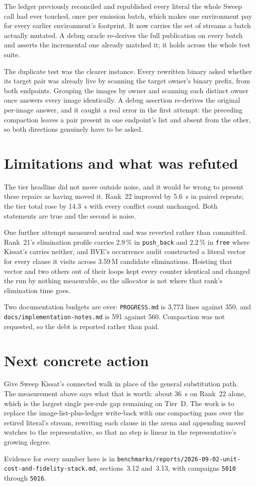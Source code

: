 \documentclass[11pt]{article}
\newcommand{\code}[1]{\texttt{#1}}
\begin{document}
The ledger previously reconciled and republished every literal the whole Sweep
call had ever touched, once per emission batch, which makes one environment pay
for every earlier environment's footprint. It now carries the set of streams a
batch actually mutated. A debug oracle re-derives the full publication on every
batch and asserts the incremental one already matched it; it holds across the
whole test suite.

The duplicate test was the clearer instance. Every rewritten binary asked
whether its target pair was already live by scanning the target owner's binary
prefix, from both endpoints. Grouping the images by owner and scanning each
distinct owner once answers every image identically. A debug assertion
re-derives the original per-image answer, and it caught a real error in the
first attempt: the preceding compaction leaves a pair present in one endpoint's
list and absent from the other, so both directions genuinely have to be asked.

\section{Limitations and what was refuted}

The tier headline did not move outside noise, and it would be wrong to present
these repairs as having moved it. Rank~22 improved by 5.6~s in paired repeats;
the tier total rose by 14.3~s with every conflict count unchanged. Both
statements are true and the second is noise.

One further attempt measured neutral and was reverted rather than committed.
Rank~21's elimination profile carries 2.9\,\% in \code{push\_back} and 2.2\,\%
in \code{free} where Kissat's carries neither, and BVE's occurrence audit
constructed a literal vector for every clause it visits across 3.59\,M
candidate eliminations. Hoisting that vector and two others out of their loops
kept every counter identical and changed the run by nothing measurable, so the
allocator is not where that rank's elimination time goes.

Two documentation budgets are over: \code{PROGRESS.md} is 3{,}773 lines against
350, and \code{docs/implementation-notes.md} is 591 against 560. Compaction was
not requested, so the debt is reported rather than paid.

\section{Next concrete action}

Give Sweep Kissat's connected walk in place of the general substitution path.
The measurement above says what that is worth: about 36~s on Rank~22 alone,
which is the largest single per-rule gap remaining on Tier~D. The work is to
replace the image-list-plus-ledger write-back with one compacting pass over the
retired literal's stream, rewriting each clause in the arena and appending
moved watches to the representative, so that no step is linear in the
representative's growing degree.

Evidence for every number here is in
\code{benchmarks/reports/2026-09-02-unit-cost-and-fidelity-stack.md},
sections~3.12 and~3.13, with campaigns \code{5010} through \code{5016}.
\end{document}
